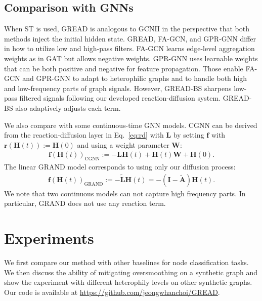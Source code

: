 \documentclass{article}
\theoremstyle{plain}
\theoremstyle{definition}
\theoremstyle{remark}
\begin{document}
\subsection{Comparison with GNNs}

When ST is used, GREAD is analogous to GCNII in the perspective that both methods inject the initial hidden state. GREAD, FA-GCN, and GPR-GNN differ in how to utilize low and high-pass filters. FA-GCN learns edge-level aggregation weights as in GAT but allows negative weights. GPR-GNN uses learnable weights that can be both positive and negative for feature propagation. Those enable FA-GCN and GPR-GNN to adapt to heterophilic graphs and to handle both high and low-frequency parts of graph signals. However, GREAD-BS sharpens low-pass filtered signals following our developed reaction-diffusion system. GREAD-BS also adaptively adjusts each term.


We also compare with some continuous-time GNN models. CGNN can be derived from the reaction-diffusion layer in Eq.~\eqref{eq:rd} with $\mathbf{L}$ by setting $\mathbf{f}$ with $\mathbf{r}(\mathbf{H}(t)) := \mathbf{H}(0)$ and using a weight parameter $\mathbf{W}$:
\begin{align}
\mathbf{f}(\mathbf{H}(t))_{\text{CGNN}} := -\mathbf{L}\mathbf{H}(t) + \mathbf{H}(t)\mathbf{W} + \mathbf{H}(0).
\end{align}
The linear GRAND model corresponds to using only our diffusion process:
\begin{align}
\mathbf{f}(\mathbf{H}(t))_{\text{GRAND}} := -\tilde{\mathbf{L}}\mathbf{H}(t) = -(\mathbf{I}-\tilde{\mathbf{A}})\mathbf{H}(t).
\end{align}
We note that two continuous models can not capture high frequency parts. In particular, GRAND does not use any reaction term.

\section{Experiments}
We first compare our method with other baselines for node classification tasks. We then discuss the ability of mitigating oversmoothing on a synthetic graph and show the experiment with different heterophily levels on other synthetic graphs. Our code is available at \url{https://github.com/jeongwhanchoi/GREAD}.
\end{document}
